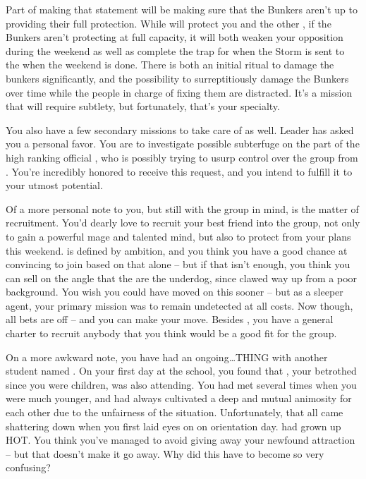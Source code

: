 \documentclass[char]{GL2020}
\begin{document}
Part of making that statement will be making sure that the Bunkers aren’t up to providing their full protection. While \cGenesis{} will protect you and the other \pGoaties{}, if the Bunkers aren’t protecting at full capacity, it will both weaken your opposition during the weekend as well as complete the trap for when the Storm is sent to the \pSc{} when the weekend is done. There is both an initial ritual to damage the bunkers significantly, and the possibility to surreptitiously damage the Bunkers over time while the people in charge of fixing them are distracted. It’s a mission that will require subtlety, but fortunately, that’s your specialty.
 
You also have a few secondary missions to take care of as well. Leader \cChupLeader{} has asked you a personal favor. You are to investigate possible subterfuge on the part of the high ranking official \cChupSecond{}, who is possibly trying to usurp control over the group from \cChupLeader{}. You’re incredibly honored to receive this request, and you intend to fulfill it to your utmost potential.
 
Of a more personal note to you, but still with the group in mind, is the matter of recruitment. You’d dearly love to recruit your best friend \cAmbition{} into the group, not only to gain a powerful mage and talented mind, but also to protect \cAmbition{\them} from your plans this weekend. \cAmbition{} is defined by \cAmbition{\their} ambition, and you think you have a good chance at convincing \cAmbition{\them} to join based on that alone -- but if that isn’t enough, you think you can sell \cAmbition{\them} on the angle that the \pGoaties{} are the underdog, since \cAmbition{} clawed \cAmbition{\their} way up from a poor background. You wish you could have moved on this sooner -- but as a sleeper agent, your primary mission was to remain undetected at all costs. Now though, all bets are off -- and you can make your move. Besides \cAmbition{}, you have a general charter to recruit anybody that you think would be a good fit for the group.
 
On a more awkward note, you have had an ongoing\ldots THING with another student named \cHeir{}. On your first day at the school, you found that \cHeir{}, your betrothed since you were children, was also attending. You had met several times when you were much younger, and had always cultivated a deep and mutual animosity for each other due to the unfairness of the situation. Unfortunately, that all came shattering down when you first laid eyes on \cHeir{\them} on orientation day. \cHeir{} had grown up HOT. You think you’ve managed to avoid giving away your newfound attraction -- but that doesn’t make it go away. Why did this have to become so very confusing?
 
\end{document}
